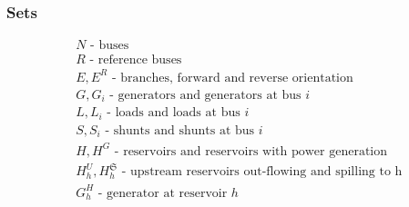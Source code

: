 \documentclass{juliacon}
\begin{document}
\subsubsection*{Sets}
\begin{align*}
%
& N \mbox{ - buses}\nonumber \\
& R \mbox{ - reference buses}\nonumber \\
& E, E^R \mbox{ - branches, forward and reverse orientation} \nonumber \\
& G, G_i \mbox{ - generators and generators at bus $i$} \nonumber \\
& L, L_i \mbox{ - loads and loads at bus $i$} \nonumber \\
& S, S_i \mbox{ - shunts and shunts at bus $i$} \nonumber \\
& H, H^G \mbox{ - reservoirs and reservoirs with power generation}\nonumber \\
& H^U_h, H^{\mathfrak{S}}_h \mbox{ - upstream reservoirs out-flowing and spilling to h }\nonumber \\
& G^H_h \mbox{ - generator at reservoir $h$}\nonumber \\
%
\end{align*}
\end{document}
